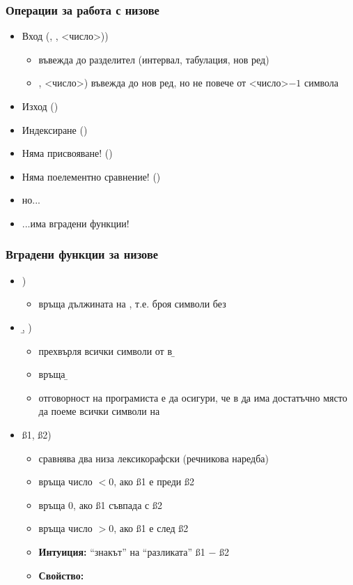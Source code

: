 \documentclass{beamer}
\begin{document}
\begin{frame}
  \frametitle{Операции за работа с низове}

  \begin{itemize}[<+->]
  \item Вход (\tta{>{}>}, \s, <число>\tta))
    \begin{itemize}
    \item \tta{>{}>} въвежда до разделител (интервал, табулация, нов ред)
    \item {}\s, <число>\tta) въвежда до нов ред, но не повече от <число>$-1$ символа
    \end{itemize}

  \item Изход (\tta{<{}<})
  \item Индексиране (\tta{[]})
  \item Няма присвояване! ()
  \item Няма поелементно сравнение! ()
  \item но...
  \item ...има вградени функции!
  \end{itemize}
\end{frame}

\begin{frame}
  \frametitle{Вградени функции за низове}


  \begin{itemize}[<+->]
  \item {}\s\tta)
    \begin{itemize}
    \item връща дължината на \s, т.е. броя символи без \term
    \end{itemize}
  \item {}\b, \s\tta)
    \begin{itemize}
    \item прехвърля всички символи от \s в \b
    \item връща \b
    \item \alert{отговорност на програмиста е да осигури, че в \b да има достатъчно място да поеме всички символи на \s}
    \end{itemize}
  \item {}\ss1, \ss2\tta)
    \begin{itemize}
    \item сравнява два низа \alert{лексикорафски} (речникова наредба)
    \item връща число $<0$, ако \ss1 е преди \ss2
    \item връща 0, ако \ss1 съвпада с \ss2
    \item връща число $>0$, ако \ss1 е след \ss2
    \item \textbf{Интуиция:} ``знакът'' на ``разликата'' \ss1 $-$ \ss2
    \item \textbf{Свойство:} 
    \end{itemize}
  \end{itemize}
\end{frame}
\end{document}

